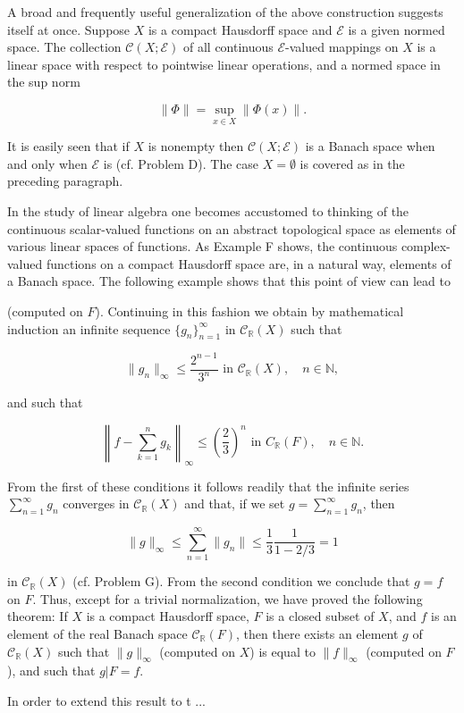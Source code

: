 A broad and frequently useful generalization of the above construction suggests itself at once. Suppose $X$ is a compact Hausdorff space and $\mathcal{E}$ is a given normed space. The collection $\mathcal{C}(X; \mathcal{E})$ of all continuous $\mathcal{E}$-valued mappings on $X$ is a linear space with respect to pointwise linear operations, and a normed space in the sup norm

$$\|\Phi\| = \sup_{x \in X} \|\Phi(x)\|.$$

It is easily seen that if $X$ is nonempty then $\mathcal{C}(X; \mathcal{E})$ is a Banach space when and only when $\mathcal{E}$ is (cf. Problem D). The case $X = \emptyset$ is covered as in the preceding paragraph.

In the study of linear algebra one becomes accustomed to thinking of the continuous scalar-valued functions on an abstract topological space as elements of various linear spaces of functions. As Example F shows, the continuous complex-valued functions on a compact Hausdorff space are, in a natural way, elements of a Banach space. The following example shows that this point of view can lead to

(computed on $F$). Continuing in this fashion we obtain by mathematical induction an infinite sequence $\{g_n\}_{n=1}^{\infty}$ in $\mathcal{C}_{\mathbb{R}}(X)$ such that

$$\|g_n\|_{\infty} \leq \frac{2^{n-1}}{3^n} \text{ in } \mathcal{C}_{\mathbb{R}}(X), \quad n \in \mathbb{N},$$

and such that

$$\left\|f - \sum_{k=1}^{n} g_k\right\|_{\infty} \leq \left(\frac{2}{3}\right)^n \text{ in } C_{\mathbb{R}}(F), \quad n \in \mathbb{N}.$$

From the first of these conditions it follows readily that the infinite series $\sum_{n=1}^{\infty} g_n$ converges in $\mathcal{C}_{\mathbb{R}}(X)$ and that, if we set $g = \sum_{n=1}^{\infty} g_n$, then

$$\|g\|_{\infty} \leq \sum_{n=1}^{\infty} \|g_n\| \leq \frac{1}{3} \frac{1}{1-2/3} = 1$$

in $\mathcal{C}_{\mathbb{R}}(X)$ (cf. Problem G). From the second condition we conclude that $g = f$ on $F$. Thus, except for a trivial normalization, we have proved the following theorem: If $X$ is a compact Hausdorff space, $F$ is a closed subset of $X$, and $f$ is an element of the real Banach space $\mathcal{C}_{\mathbb{R}}(F)$, then there exists an element $g$ of $\mathcal{C}_{\mathbb{R}}(X)$ such that $\|g\|_{\infty}$ (computed on $X$) is equal to $\|f\|_{\infty}$ (computed on $F$), and such that $g|F = f$.

In order to extend this result to t
...
